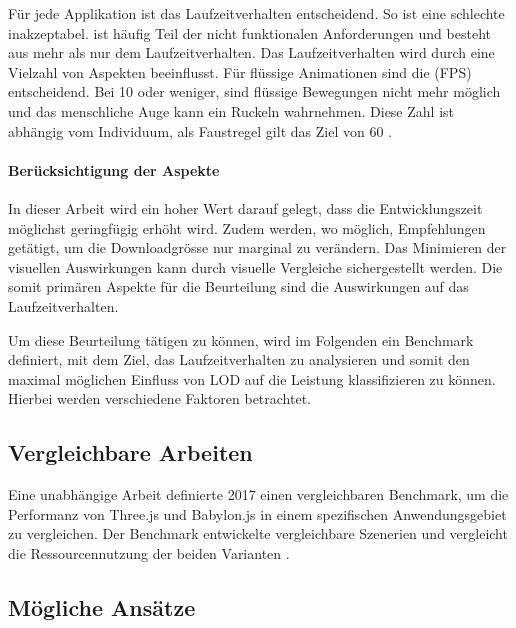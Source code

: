 Für jede Applikation ist das Laufzeitverhalten entscheidend. So ist eine schlechte  inakzeptabel.  ist häufig Teil der nicht funktionalen Anforderungen und besteht aus mehr als nur dem Laufzeitverhalten.
Das Laufzeitverhalten wird durch eine Vielzahl von Aspekten beeinflusst.
Für flüssige Animationen sind die  (FPS) entscheidend. Bei 10  oder weniger, sind flüssige Bewegungen nicht mehr möglich und das menschliche Auge kann ein Ruckeln wahrnehmen. Diese Zahl ist abhängig vom Individuum, als Faustregel gilt das Ziel von 60  \cite{limitsOfHumanVision}.

\paragraph{Berücksichtigung der Aspekte}
In dieser Arbeit wird ein hoher Wert darauf gelegt, dass die Entwicklungszeit möglichst geringfügig erhöht wird. Zudem werden, wo möglich, Empfehlungen getätigt, um die Downloadgrösse nur marginal zu verändern. Das Minimieren der visuellen Auswirkungen kann durch visuelle Vergleiche sichergestellt werden.
Die somit primären Aspekte für die Beurteilung sind die Auswirkungen auf das Laufzeitverhalten.


Um diese Beurteilung tätigen zu können, wird im Folgenden ein Benchmark definiert, mit dem Ziel, das Laufzeitverhalten zu analysieren und somit den maximal möglichen Einfluss von LOD auf die Leistung klassifizieren zu können. Hierbei werden verschiedene Faktoren betrachtet.

\subsection{Vergleichbare Arbeiten}
Eine unabhängige Arbeit definierte 2017 einen vergleichbaren Benchmark, um die Performanz von Three.js und Babylon.js in einem spezifischen Anwendungsgebiet zu vergleichen. Der Benchmark entwickelte vergleichbare Szenerien und vergleicht die Ressourcennutzung der beiden Varianten \cite{performanceComparisonBabylonThreejs}.

\subsection{Mögliche Ansätze}

